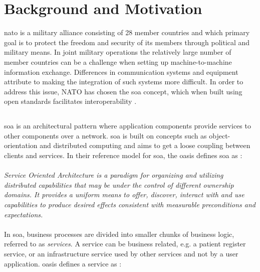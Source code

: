 \section{Background and Motivation}

\gls{nato} is a military alliance consisting of 28 member countries
\cite{nato-homepage-member-countries} and which primary goal is to protect the
freedom and security of its members through political and military means. In
joint military operations the relatively large number of member countries can be
a challenge when setting up machine-to-machine information exchange. Differences
in communication systems and equipment attribute to making the integration of
such systems more difficult. In order to address this issue, NATO has chosen the
\gls{soa} concept, which when built using open standards facilitates
interoperability \cite{nnec-study}.

\subsection{}
\gls{soa} is an architectural pattern where application components
provide services to other components over a network. \gls{soa} is built on
concepts such as object-orientation and distributed computing and aims to get
a loose coupling between clients and services. In their reference model for
\gls{soa}, the \gls{oasis} defines \gls{soa} as \cite{oasis-soa-reference-model}:

\paragraph{}

\textit{Service Oriented Architecture is a paradigm for organizing and utilizing
distributed capabilities that may be under the control of different ownership
domains. It provides a uniform means to offer, discover, interact with and use
capabilities to produce desired effects consistent with measurable preconditions
and expectations.}

\paragraph{}

In \gls{soa}, business processes are divided into smaller chunks of business
logic, referred to as \textit{services}. A service can be business related, e.g.
a patient register service, or an infrastructure service used by other services
and not by a user application. \gls{oasis} defines a service as
\cite{oasis-soa-reference-model}:

